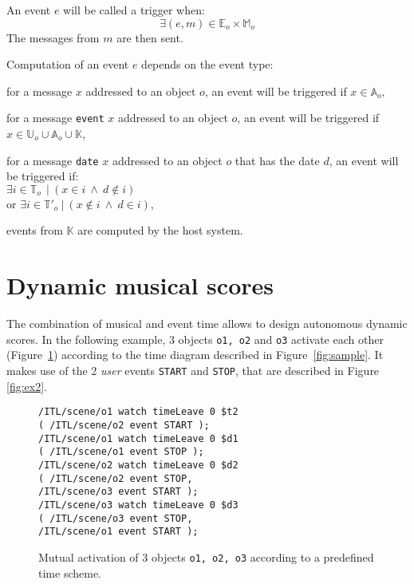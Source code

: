 \documentclass{article}
\newcommand{\OSC}[1]	{{\fontsize{8.5pt}{8pt} \selectfont\texttt{#1}}}
\newcommand{\tab}{\hspace*{4mm}}
\let\olditemize\itemize
\let\oldenditemize\enditemize
\renewenvironment{itemize} 	{\olditemize \renewcommand{\labelitemi}{$\bullet$} \setlength{\itemsep}{0mm}}{\oldenditemize}
\newcommand{\sample}[1]		{\vspace{-0.2em}\begin{center}\colorbox{mygrey}{\begin{minipage}[t]{0.98\columnwidth} {\small \texttt{#1}}\end{minipage}}\end{center}}
\begin{document}
An event $e$ will be called a trigger when:
\[
	\exists (e, m) \in \mathbb{E}_o \times \mathbb{M}_o  
\] 
The messages from $m$ are then sent.

Computation of an event $e$ depends on the event type:
\begin{itemize}
\item[-] for a message $x$ addressed to an object $o$, an event will be triggered if $x \in \mathbb{A}_o$, 
\item[-] for a message \OSC{event} $x$ addressed to an object $o$, an event will be triggered if $x \in \mathbb{U}_o \cup \mathbb{A}_o \cup  \mathbb{K}$,
\item[-] for a message \OSC{date} $x$ addressed to an object $o$ that has the date $d$, an event will be triggered if:\\ 
\hspace*{3.5mm} $\exists i \in \mathbb{T}_o\ \ |\ (x \in i\ \land\ d \not\in i)$ \\
or $\exists i \in \mathbb{T'}_o\ |\ (x \not \in i\ \land\ d \in i)$,
\item[-] events from $\mathbb{K}$ are computed by the host system.
\end{itemize}

\section{Dynamic musical scores}

The combination of musical and event time allows to design autonomous dynamic scores. In the following example, 3 objects \OSC{o1, o2} and \OSC{o3} activate each other
(Figure~\ref{fig:ex1}) according to the time diagram described in Figure~\ref{fig:sample}. It makes use of the 2 \emph{user} events \OSC{START} and \OSC{STOP}, that are described in Figure \ref{fig:ex2}.

\begin{figure}[h]
   \centering
\sample{/ITL/scene/o1 watch timeLeave 0 \$t2 \\
   \tab( /ITL/scene/o2 event START );\\
	/ITL/scene/o1 watch timeLeave 0 \$d1 \\
	\tab( /ITL/scene/o1 event STOP );\\
	/ITL/scene/o2 watch timeLeave 0 \$d2 \\
	\tab( /ITL/scene/o2 event STOP, \\
	\tab \tab/ITL/scene/o3 event START );\\
	/ITL/scene/o3 watch timeLeave 0 \$d3 \\
	\tab( /ITL/scene/o3 event STOP, \\
	\tab \tab/ITL/scene/o1 event START );
}
   \caption{Mutual activation of 3 objects \OSC{o1, o2, o3} according to a predefined time scheme.}
   \label{fig:ex1}
\end{figure}
\end{document}
